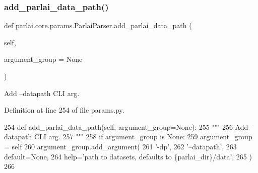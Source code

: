 \mbox{\label{classparlai_1_1core_1_1params_1_1ParlaiParser_a896033a34a5e5e1bbc081d99e9835d6b}} 
\subsubsection{\texorpdfstring{add\+\_\+parlai\+\_\+data\+\_\+path()}{add\_parlai\_data\_path()}}
{\footnotesize\ttfamily def parlai.\+core.\+params.\+Parlai\+Parser.\+add\+\_\+parlai\+\_\+data\+\_\+path (\begin{DoxyParamCaption}\item[{}]{self,  }\item[{}]{argument\+\_\+group = {\ttfamily None} }\end{DoxyParamCaption})}

\begin{DoxyVerb}Add --datapath CLI arg.
\end{DoxyVerb}
 

Definition at line 254 of file params.\+py.


\begin{DoxyCode}
254     \textcolor{keyword}{def }add\_parlai\_data\_path(self, argument\_group=None):
255         \textcolor{stringliteral}{"""}
256 \textcolor{stringliteral}{        Add --datapath CLI arg.}
257 \textcolor{stringliteral}{        """}
258         \textcolor{keywordflow}{if} argument\_group \textcolor{keywordflow}{is} \textcolor{keywordtype}{None}:
259             argument\_group = self
260         argument\_group.add\_argument(
261             \textcolor{stringliteral}{'-dp'},
262             \textcolor{stringliteral}{'--datapath'},
263             default=\textcolor{keywordtype}{None},
264             help=\textcolor{stringliteral}{'path to datasets, defaults to \{parlai\_dir\}/data'},
265         )
266 
\end{DoxyCode}
\mbox{\label{classparlai_1_1core_1_1params_1_1ParlaiParser_a7d85a5e2fac2c1e8f0f75a4255850b9b}} 
